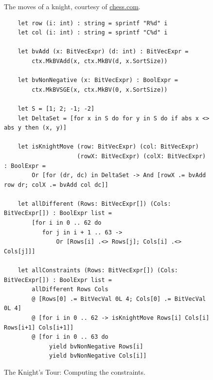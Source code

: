 \begin{figure}[!ht]
  \centering
  \caption{The moves of a knight, courtesy of \href{https://www.chess.com/}{chess.com}.}
  \label{fig:knight-moves.png}
\end{figure}

\begin{figure}[!ht]
\centering
\begin{verbatim}
    let row (i: int) : string = sprintf "R%d" i
    let col (i: int) : string = sprintf "C%d" i

    let bvAdd (x: BitVecExpr) (d: int) : BitVecExpr =
        ctx.MkBVAdd(x, ctx.MkBV(d, x.SortSize))

    let bvNonNegative (x: BitVecExpr) : BoolExpr =
        ctx.MkBVSGE(x, ctx.MkBV(0, x.SortSize))

    let S = [1; 2; -1; -2]
    let DeltaSet = [for x in S do for y in S do if abs x <> abs y then (x, y)]

    let isKnightMove (row: BitVecExpr) (col: BitVecExpr)
                     (rowX: BitVecExpr) (colX: BitVecExpr) : BoolExpr =
        Or [for (dr, dc) in DeltaSet -> And [rowX .= bvAdd row dr; colX .= bvAdd col dc]]

    let allDifferent (Rows: BitVecExpr[]) (Cols: BitVecExpr[]) : BoolExpr list =
        [for i in 0 .. 62 do
           for j in i + 1 .. 63 ->
               Or [Rows[i] .<> Rows[j]; Cols[i] .<> Cols[j]]]

    let allConstraints (Rows: BitVecExpr[]) (Cols: BitVecExpr[]) : BoolExpr list =
        allDifferent Rows Cols
        @ [Rows[0] .= BitVecVal 0L 4; Cols[0] .= BitVecVal 0L 4]
        @ [for i in 0 .. 62 -> isKnightMove Rows[i] Cols[i] Rows[i+1] Cols[i+1]]
        @ [for i in 0 .. 63 do
             yield bvNonNegative Rows[i]
             yield bvNonNegative Cols[i]]
\end{verbatim}
\vspace*{-0.3cm}
\caption{The Knight's Tour: Computing the constraints.}
\label{fig:Knight's Tour with Z3.ipynb-1}
\end{figure}



